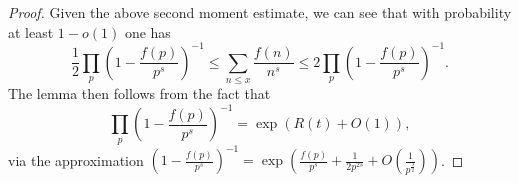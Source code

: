 \documentclass[12pt]{amsart}
\newtheorem{lemma}[theorem]{Lemma}
\theoremstyle{remark}
\theoremstyle{definition}
\theoremstyle{remark}
\numberwithin{equation}{section}
\begin{document}
\begin{proof}
  Given the above second moment estimate, we can see that with probability at least $1 - o(1)$ one has
    $$\frac{1}{2}\prod_{p} \left( 1 - \frac{f(p)}{p^s} \right)^{-1} \le \sum_{n \le x} \frac{f(n)}{n^s} \le 2\prod_{p} \left( 1 - \frac{f(p)}{p^s} \right)^{-1}.$$
    The lemma then follows from the fact that
    $$\prod_{p} \left( 1 - \frac{f(p)}{p^s} \right)^{-1} = \exp(R(t)+O(1)),$$
via the approximation $\left(1-\frac{f(p)}{p^s}\right)^{-1} = \exp\left(\frac{f(p)}{p^s}+\frac{1}{2p^{2s}}+O\left(\frac{1}{p^\frac{3}{2}}\right)\right)$. 

    

    
\end{proof}

\end{document}
